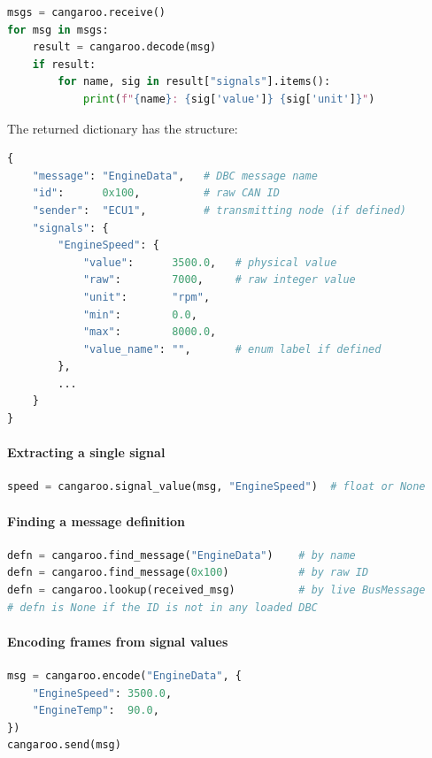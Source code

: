 \documentclass[a4paper,11pt]{article}
\begin{document}
\begin{lstlisting}[language=Python, caption={Decode signals from a received frame}]
msgs = cangaroo.receive()
for msg in msgs:
    result = cangaroo.decode(msg)
    if result:
        for name, sig in result["signals"].items():
            print(f"{name}: {sig['value']} {sig['unit']}")
\end{lstlisting}

The returned dictionary has the structure:

\begin{lstlisting}[language=Python]
{
    "message": "EngineData",   # DBC message name
    "id":      0x100,          # raw CAN ID
    "sender":  "ECU1",         # transmitting node (if defined)
    "signals": {
        "EngineSpeed": {
            "value":      3500.0,   # physical value
            "raw":        7000,     # raw integer value
            "unit":       "rpm",
            "min":        0.0,
            "max":        8000.0,
            "value_name": "",       # enum label if defined
        },
        ...
    }
}
\end{lstlisting}

\paragraph{Extracting a single signal}

\begin{lstlisting}[language=Python]
speed = cangaroo.signal_value(msg, "EngineSpeed")  # float or None
\end{lstlisting}

\paragraph{Finding a message definition}

\begin{lstlisting}[language=Python]
defn = cangaroo.find_message("EngineData")    # by name
defn = cangaroo.find_message(0x100)           # by raw ID
defn = cangaroo.lookup(received_msg)          # by live BusMessage
# defn is None if the ID is not in any loaded DBC
\end{lstlisting}

\paragraph{Encoding frames from signal values}

\begin{lstlisting}[language=Python, caption={Build and send a frame by signal name}]
msg = cangaroo.encode("EngineData", {
    "EngineSpeed": 3500.0,
    "EngineTemp":  90.0,
})
cangaroo.send(msg)
\end{lstlisting}
\end{document}
